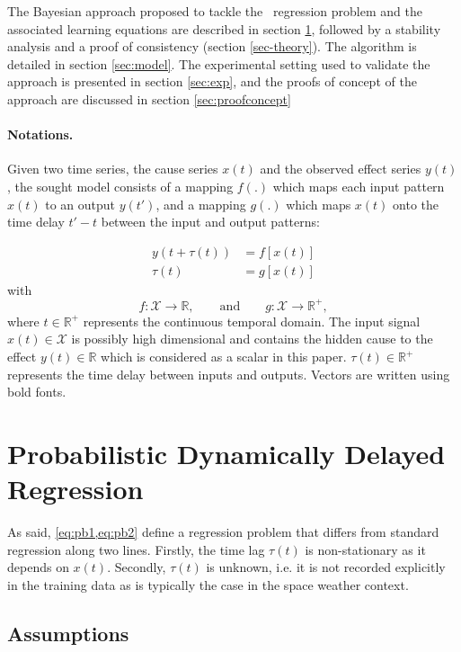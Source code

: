 The Bayesian approach proposed to tackle the \XX\ regression problem and the associated learning 
equations are described in section \ref{sec-formulation}, followed by a stability analysis and a 
proof of consistency (section \ref{sec-theory}). The algorithm is detailed in section \ref{sec:model}. 
The experimental setting used to validate the approach is presented in section \ref{sec:exp}, and 
the proofs of concept of the approach are discussed in section \ref{sec:proofconcept}

\paragraph{Notations.}
Given two time series, the cause series $x(t)$ and the observed effect series $y(t)$, the sought model 
consists of a mapping $f(.)$ which maps each input pattern $x(t)$ to an output $y(t')$, and a 
mapping $g(.)$ which maps $x(t)$ onto the time delay $t'-t$ between the input and output patterns:

\begin{align}
y(t + \tau(t)) & = f[x(t)]\label{eq:pb1}\\
\tau(t) & = g[x(t)]\label{eq:pb2} 
\end{align}
with
\[
f: \mathcal{X}  \rightarrow \mathbb{R},\qquad\text{and}\qquad
g: \mathcal{X}  \rightarrow \mathbb{R}^{+},
\]
where $t \in \mathbb{R}^{+}$ represents the continuous temporal domain. The input signal 
$x(t)\in \mathcal{X}$ is possibly high dimensional and contains the hidden cause to 
the effect $y(t)\in\mathbb{R}$ which is considered as a scalar in this paper. 
$\tau(t)\in \mathbb{R}^+$ represents the time delay between inputs and outputs.
Vectors are written using bold fonts.

\section{Probabilistic Dynamically Delayed Regression}\label{sec-formulation}
As said, \cref{eq:pb1,eq:pb2} define a regression problem that differs from standard regression 
along two lines. Firstly, the time lag $\tau(t)$ is non-stationary as it depends on $x(t)$.  Secondly, 
$\tau(t)$ is unknown, i.e. it is not recorded explicitly in the training data as is typically the case in 
the space weather context. 

\subsection{Assumptions}

